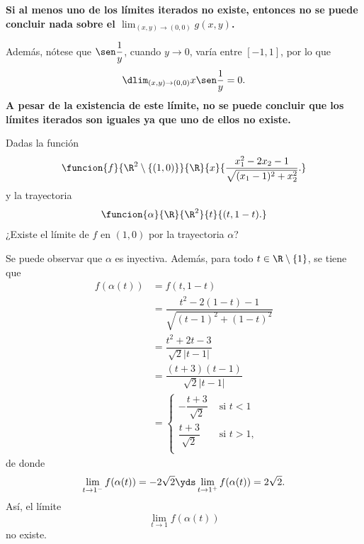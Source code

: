 \documentclass[a4,11pt]{aleph-examen}
\begin{document}
\begin{preguntas}
\begin{respuesta}
\begin{respuesta}
\begin{enumerate}
            \textbf{Si al menos uno de los límites iterados no existe, entonces no se puede concluir nada sobre el \boldmath$\lim_{(x,y)\to (0,0)}g(x,y)$.} 
            
            Además, nótese que $\sen \dfrac{1}{y}$, cuando $y\to 0$, varía entre $[-1,1]$, por lo que 
            \[
                \dlim_{(x,y)\to (0,0)}x\sen \dfrac{1}{y}=0.
            \]
            \textbf{A pesar de la existencia de este límite, no se puede concluir que los límites iterados son iguales ya que uno de ellos no existe.} 
            
    \end{enumerate}
    
\end{respuesta}

\item
	Dadas la función 
	\[
		\funcion{f}{\R^2\setminus\{(1,0)\}}{\R}{x}%
			{\dfrac{x_1^2-2x_2-1}{\sqrt{(x_1-1)^2+x_2^2}}.}
	\]
	y la trayectoria
	\[
		\funcion{\alpha}{\R}{\R^2}{t}{(t,1-t).}
	\]
	¿Existe el límite de $f$ en $(1,0)$ por la trayectoria $\alpha$?
	

\begin{respuesta}
	Se puede observar que $\alpha$ es inyectiva. Además, para todo $t\in\R\setminus\{1\}$, se tiene que
	\begin{align*}
		f(\alpha(t))
			&=f(t,1-t)\\
			&=\dfrac{t^2-2(1-t)-1}{\sqrt{(t-1)^2+(1-t)^2}}\\
			&=\dfrac{t^2+2t-3}{\sqrt 2 |t-1|}\\
			&=\dfrac{(t+3)(t-1)}{\sqrt 2 |t-1|}\\
			&=
				\begin{cases}
					-\dfrac{t+3}{\sqrt 2}&\text{ si }t<1\\[2mm]
					\dfrac{t+3}{\sqrt 2}&\text{ si }t>1,\\
				\end{cases}
	\end{align*}
	de donde
	\[
		\lim_{t\to 1^-}f(\alpha(t))=-2\sqrt 2
		\yds 
		\lim_{t\to 1^+}f(\alpha(t))=2\sqrt 2.
	\]
	Así, el límite
	\[
		\lim_{t\to 1}f(\alpha(t))
	\]
	no existe.
\end{respuesta}


\end{respuesta}
\end{preguntas}
\end{document}
